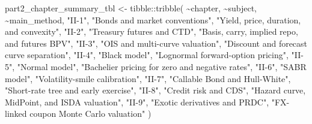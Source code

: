 \documentclass[
  letterpaper,
  DIV=11,
  numbers=noendperiod]{scrreprt}
\newenvironment{Shaded}{\begin{snugshade}}{\end{snugshade}}
\newcommand{\FunctionTok}[1]{\textcolor[rgb]{0.28,0.35,0.67}{#1}}
\newcommand{\NormalTok}[1]{\textcolor[rgb]{0.00,0.23,0.31}{#1}}
\newcommand{\OtherTok}[1]{\textcolor[rgb]{0.00,0.23,0.31}{#1}}
\newcommand{\SpecialCharTok}[1]{\textcolor[rgb]{0.37,0.37,0.37}{#1}}
\newcommand{\StringTok}[1]{\textcolor[rgb]{0.13,0.47,0.30}{#1}}
\begin{document}
\begin{Shaded}
\begin{Highlighting}[]
\NormalTok{part2\_chapter\_summary\_tbl }\OtherTok{\textless{}{-}}\NormalTok{ tibble}\SpecialCharTok{::}\FunctionTok{tribble}\NormalTok{(}
  \SpecialCharTok{\textasciitilde{}}\NormalTok{chapter, }\SpecialCharTok{\textasciitilde{}}\NormalTok{subject,                              }\SpecialCharTok{\textasciitilde{}}\NormalTok{main\_method,}
  \StringTok{"II{-}1"}\NormalTok{,   }\StringTok{"Bonds and market conventions"}\NormalTok{,        }\StringTok{"Yield, price, duration, and convexity"}\NormalTok{,}
  \StringTok{"II{-}2"}\NormalTok{,   }\StringTok{"Treasury futures and CTD"}\NormalTok{,             }\StringTok{"Basis, carry, implied repo, and futures BPV"}\NormalTok{,}
  \StringTok{"II{-}3"}\NormalTok{,   }\StringTok{"OIS and multi{-}curve valuation"}\NormalTok{,        }\StringTok{"Discount and forecast curve separation"}\NormalTok{,}
  \StringTok{"II{-}4"}\NormalTok{,   }\StringTok{"Black model"}\NormalTok{,                          }\StringTok{"Lognormal forward{-}option pricing"}\NormalTok{,}
  \StringTok{"II{-}5"}\NormalTok{,   }\StringTok{"Normal model"}\NormalTok{,                         }\StringTok{"Bachelier pricing for zero and negative rates"}\NormalTok{,}
  \StringTok{"II{-}6"}\NormalTok{,   }\StringTok{"SABR model"}\NormalTok{,                           }\StringTok{"Volatility{-}smile calibration"}\NormalTok{,}
  \StringTok{"II{-}7"}\NormalTok{,   }\StringTok{"Callable Bond and Hull{-}White"}\NormalTok{,          }\StringTok{"Short{-}rate tree and early exercise"}\NormalTok{,}
  \StringTok{"II{-}8"}\NormalTok{,   }\StringTok{"Credit risk and CDS"}\NormalTok{,                  }\StringTok{"Hazard curve, MidPoint, and ISDA valuation"}\NormalTok{,}
  \StringTok{"II{-}9"}\NormalTok{,   }\StringTok{"Exotic derivatives and PRDC"}\NormalTok{,          }\StringTok{"FX{-}linked coupon Monte Carlo valuation"}
\NormalTok{)}


\end{Highlighting}
\end{Shaded}
\end{document}
